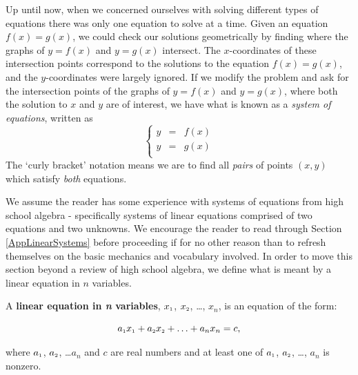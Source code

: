 

\setcounter{footnote}{0}

\label{LinSystems}

\setlength{\extrarowheight}{0pt}

Up until now, when we concerned ourselves with solving different types of equations there was only one equation to solve at a time.  Given an equation $f(x) = g(x)$, we could check our solutions geometrically by finding where the graphs of $y=f(x)$ and $y=g(x)$ intersect. The $x$-coordinates of these intersection points correspond to the solutions to the equation $f(x) = g(x)$, and the $y$-coordinates were largely ignored.  If we modify the problem and ask for the intersection points of the graphs of $y=f(x)$ and $y=g(x)$, where both the solution to $x$ and $y$ are of interest, we have what is known as a  \textit{system of equations},  written as \[ \left\{ \begin{array}{rcl} y & = & f(x) \\ y & = & g(x) \\ \end{array} \right.\]  The `curly bracket' notation means we are  to find all \textit{pairs} of points $(x,y)$ which satisfy \textit{both} equations.  

We assume the reader has some experience with systems of equations from high school algebra - specifically systems of linear equations comprised of two equations and two unknowns. We encourage the reader to read through Section \ref{AppLinearSystems} before proceeding if for no other reason than to refresh themselves on the basic mechanics and vocabulary involved.  In order to move this section beyond a review of high school algebra, we  define what is meant by a linear equation in $n$ variables.

\smallskip

\colorbox{ResultColor}{\bbm

\begin{defn}  \label{lineareqnnvariables}  A \textbf{linear equation in \textit{n} variables}, $x_{\mbox{\tiny $1$}}$, $x_{\mbox{\tiny $2$}}$, \ldots, $x_{n}$, is an equation of the form:

 \[a_{\mbox{\tiny $1$}} x_{\mbox{\tiny $1$}} + a_{\mbox{\tiny $2$}} x_{\mbox{\tiny $2$}} + \ldots + a_{n} x_{n} = c,\]
 
 
  where $a_{\mbox{\tiny $1$}}$, $a_{\mbox{\tiny $2$}}$, \dots $a_{n}$  and $c$ are real numbers and at least one of $a_{\mbox{\tiny $1$}}$, $a_{\mbox{\tiny $2$}}$, \dots, $a_{n}$ is nonzero.

\end{defn}

\ebm}

